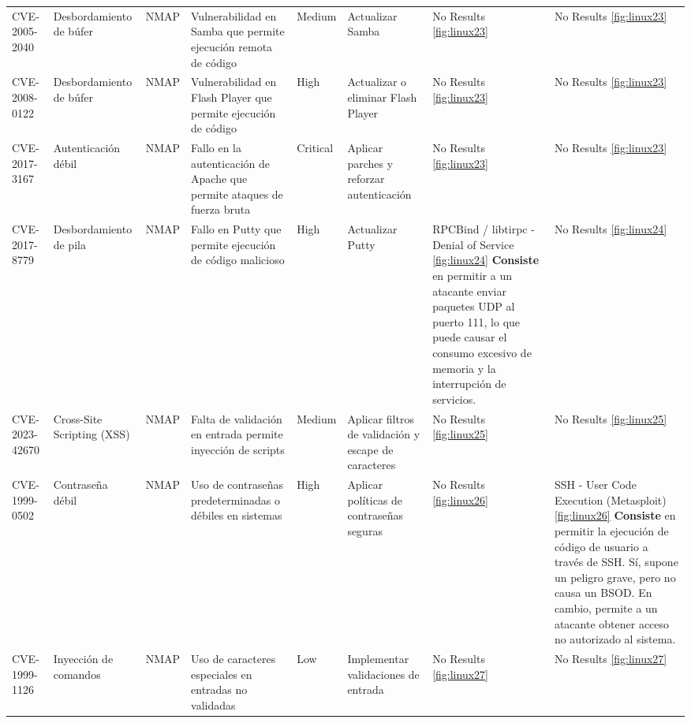 \documentclass[a4paper,12pt]{article} %
\begin{document}
\begin{table}[hp!]
{\begin{tabular}{m{2.1cm}|m{2.6cm}|m{2cm}|m{4cm}|m{1cm}|m{3cm}|m{5cm}|m{5cm}}
  {CVE-2005-2040} & {Desbordamiento de búfer} & {NMAP} & {Vulnerabilidad en Samba que permite ejecución remota de código} & {Medium} & {Actualizar Samba} & {No Results \ref{fig:linux23}}  & {No Results \ref{fig:linux23}}\\
  {CVE-2008-0122} & {Desbordamiento de búfer} & {NMAP} & {Vulnerabilidad en Flash Player que permite ejecución de código} & {High} & {Actualizar o eliminar Flash Player}  & {No Results \ref{fig:linux23}}  & {No Results \ref{fig:linux23}} \\
  {CVE-2017-3167} & {Autenticación débil} & {NMAP} & {Fallo en la autenticación de Apache que permite ataques de fuerza bruta} & {Critical} & {Aplicar parches y reforzar autenticación}  & {No Results \ref{fig:linux23}}  & {No Results \ref{fig:linux23}} \\
  {CVE-2017-8779} & {Desbordamiento de pila} & {NMAP} & {Fallo en Putty que permite ejecución de código malicioso} & {High} & {Actualizar Putty} & {   RPCBind / libtirpc - Denial of Service \ref{fig:linux24} \vspace{2mm} \hline \vspace{2mm} {\color{blue} \textbf{Consiste} en permitir a un atacante enviar paquetes UDP al puerto 111, lo que puede causar el consumo excesivo de memoria y la interrupción de servicios.}} & { No Results \ref{fig:linux24}} \\
  {CVE-2023-42670} & {Cross-Site Scripting (XSS)} & {NMAP} & {Falta de validación en entrada permite inyección de scripts} & {Medium} & {Aplicar filtros de validación y escape de caracteres} & {No Results \ref{fig:linux25}} & { No Results \ref{fig:linux25}} \\
  {CVE-1999-0502} & {Contraseña débil} & {NMAP} & {Uso de contraseñas predeterminadas o débiles en sistemas} & {High} & {Aplicar políticas de contraseñas seguras}   & {No Results \ref{fig:linux26}} & { SSH - User Code Execution (Metasploit)  \ref{fig:linux26} \vspace{2mm} \hline \vspace{2mm} {\color{blue} \textbf{Consiste} en permitir la ejecución de código de usuario a través de SSH.} \vspace{2mm} \hline \vspace{2mm} {\color{red} Sí, supone un peligro grave, pero no causa un BSOD. En cambio, permite a un atacante obtener acceso no autorizado al sistema.}}\\
  {CVE-1999-1126} & {Inyección de comandos} & {NMAP} & {Uso de caracteres especiales en entradas no validadas} & {Low} & {Implementar validaciones de entrada} & {No Results \ref{fig:linux27}} & { No Results \ref{fig:linux27}} \\

\end{tabular}}
\end{table}
\end{document}
